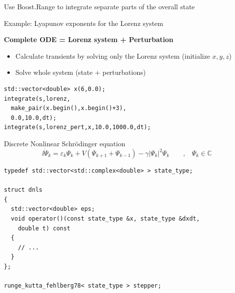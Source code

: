 \begin{frame}[fragile]

 \vspace{2ex}
 Use Boost.Range to integrate separate parts of the overall state

 \vspace{2ex}
 Example: Lyapunov exponents for the Lorenz system

 \vspace{2ex}

 \centerline{\bf Complete ODE = Lorenz system + Perturbation}


 \begin{itemize}
  \item Calculate transients by solving only the Lorenz system (initialize $x,y,z$)
  \item Solve whole system (state + perturbations)
 \end{itemize}

\vspace{2ex}

 \begin{lstlisting}
std::vector<double> x(6,0.0);
integrate(s,lorenz,
  make_pair(x.begin(),x.begin()+3),
  0.0,10.0,dt);
integrate(s,lorenz_pert,x,10.0,1000.0,dt);
 \end{lstlisting}



\end{frame}



\begin{frame}[fragile]

 \vspace{2ex}

 Discrete Nonlinear Schr\"odinger equation
$$
  \ii \dot{\Psi}_k = \varepsilon_k \Psi_k + V( \Psi_{k+1}+\Psi_{k-1}) - \gamma |\Psi_k|^2 \Psi_k
  \quad \quad \text{,} \quad \Psi_k \in \mathbb{C}
$$
 

 \begin{lstlisting}[basicstyle=\scriptsize\ttfamily]
typedef std::vector<std::complex<double> > state_type;

struct dnls
{
  std::vector<double> eps;
  void operator()(const state_type &x, state_type &dxdt,
    double t) const
  {
    // ...
  }
};

runge_kutta_fehlberg78< state_type > stepper;
 \end{lstlisting}

\end{frame}

